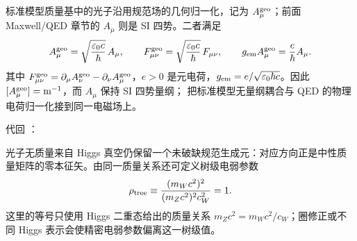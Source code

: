 \begin{definition}[光子几何归一化与 SI 桥]
标准模型质量基中的光子沿用规范场的几何归一化，记为 $A_\mu^{\rm geo}$；前面 Maxwell/QED 章节的 $A_\mu$ 则是 SI 四势。二者满足
\begin{equation}
 {
 A_\mu^{\rm geo}
 =\sqrt{\frac{\varepsilon_0c}{\hbar}}\,A_\mu,
 \qquad
 F_{\mu\nu}^{\rm geo}
 =\sqrt{\frac{\varepsilon_0c}{\hbar}}\,F_{\mu\nu},
 \qquad
 g_{\rm em}A_\mu^{\rm geo}=\frac{e}{\hbar}A_\mu.}
 \label{eq:sm-photon-geo-si-bridge-dp75}
\end{equation}
其中 $F_{\mu\nu}^{\rm geo}=\partial_\mu A_\nu^{\rm geo}-\partial_\nu A_\mu^{\rm geo}$，$e>0$ 是元电荷，$g_{\rm em}=e/\sqrt{\varepsilon_0\hbar c}$。因此 $[A_\mu^{\rm geo}]={\rm m^{-1}}$，而 $A_\mu$ 保持 SI 四势量纲； 把标准模型无量纲耦合与 QED 的物理电荷归一化接到同一电磁场上。
\end{definition}

\begin{corollary}
代回 ：

光子无质量来自 Higgs 真空仍保留一个未破缺规范生成元：对应方向正是中性质量矩阵的零本征矢。由同一质量关系还可定义树级电弱参数
\begin{equation}
 {
 \rho_{\rm tree}
 \equiv\frac{(m_Wc^2)^2}{(m_Zc^2)^2c_W^2}=1.}
 \label{eq:sm-rho-tree-dp85}
\end{equation}
这里的等号只使用 Higgs 二重态给出的质量关系 $m_Zc^2=m_Wc^2/c_W$；圈修正或不同 Higgs 表示会使精密电弱参数偏离这一树级值。
\end{corollary}

